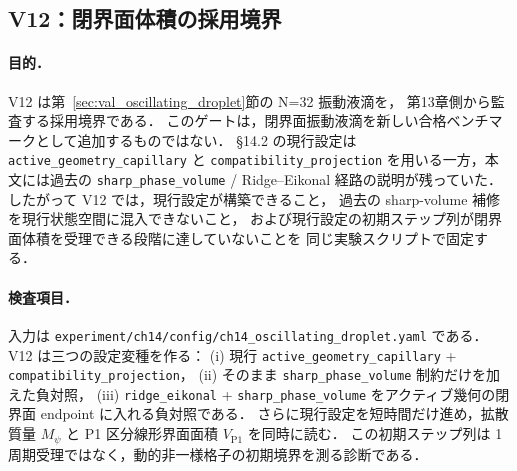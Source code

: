 %
\subsection{V12：閉界面体積の採用境界}
\label{sec:closed_interface_volume_gate}

\paragraph{目的．}
V12 は第~\ref{sec:val_oscillating_droplet}節の N=32 振動液滴を，
第13章側から監査する採用境界である．
このゲートは，閉界面振動液滴を新しい合格ベンチマークとして追加するものではない．
§14.2 の現行設定は \texttt{active\_geometry\_capillary} と
\texttt{compatibility\_projection} を用いる一方，本文には過去の
\texttt{sharp\_phase\_volume} / Ridge--Eikonal 経路の説明が残っていた．
したがって V12 では，現行設定が構築できること，
過去の sharp-volume 補修を現行状態空間に混入できないこと，
および現行設定の初期ステップ列が閉界面体積を受理できる段階に達していないことを
同じ実験スクリプトで固定する．

\paragraph{検査項目．}
入力は \texttt{experiment/ch14/config/ch14\_oscillating\_droplet.yaml} である．
V12 は三つの設定変種を作る：
(i) 現行 \texttt{active\_geometry\_capillary} +
\texttt{compatibility\_projection}，
(ii) そのまま \texttt{sharp\_phase\_volume} 制約だけを加えた負対照，
(iii) \texttt{ridge\_eikonal} +
\texttt{sharp\_phase\_volume} をアクティブ幾何の閉界面 endpoint に入れる負対照である．
さらに現行設定を短時間だけ進め，拡散質量
$M_\psi$ と P1 区分線形界面面積 $V_{\mathrm{P1}}$ を同時に読む．
この初期ステップ列は 1 周期受理ではなく，動的非一様格子の初期境界を測る診断である．

